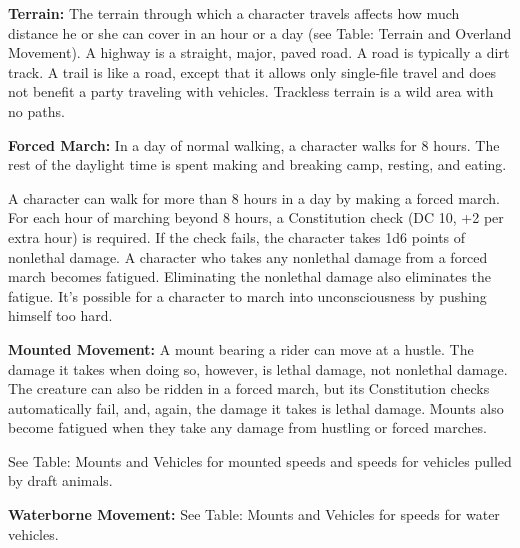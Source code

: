 \textbf{Terrain:} The terrain through which a character travels affects how much 
distance he or she can cover in an hour or a day (see Table: Terrain and Overland 
Movement). A highway is a straight, major, paved road. A road is typically a dirt 
track. A trail is like a road, except that it allows only single-file travel and 
does not benefit a party traveling with vehicles. Trackless terrain is a wild area 
with no paths.

\textbf{Forced March:} In a day of normal walking, a character walks for 8 hours. 
The rest of the daylight time is spent making and breaking camp, resting, and eating.

A character can walk for more than 8 hours in a day by making a forced march. For 
each hour of marching beyond 8 hours, a Constitution check (DC 10, +2 per extra 
hour) is required. If the check fails, the character takes 1d6 points of nonlethal 
damage. A character who takes any nonlethal damage from a forced march becomes 
fatigued. Eliminating the nonlethal damage also eliminates the fatigue. It's possible 
for a character to march into unconsciousness by pushing himself too hard.

\textbf{Mounted Movement:} A mount bearing a rider can move at a hustle. The damage 
it takes when doing so, however, is lethal damage, not nonlethal damage. The creature 
can also be ridden in a forced march, but its Constitution checks automatically 
fail, and, again, the damage it takes is lethal damage. Mounts also become fatigued 
when they take any damage from hustling or forced marches.

See Table: Mounts and Vehicles for mounted speeds and speeds for vehicles pulled 
by draft animals.

\textbf{Waterborne Movement:} See Table: Mounts and Vehicles for speeds for water 
vehicles.

